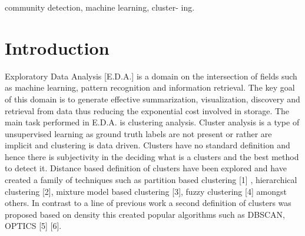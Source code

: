 \documentclass[conference]{IEEEtran}
\begin{document}




\maketitle

\begin{abstract}

\end{abstract}

\begin{IEEEkeywords}community detection, machine learning, cluster-
ing.
    
\end{IEEEkeywords}


%
\IEEEpeerreviewmaketitle



\section{Introduction}
Exploratory Data Analysis [E.D.A.] is a domain on the
intersection of fields such as machine learning, pattern
recognition and information retrieval. The key goal of this
domain is to generate effective summarization, visualization,
discovery and retrieval from data thus reducing the exponential
cost involved in storage. The main task performed in E.D.A. is
clustering analysis. Cluster analysis is a type of unsupervised
learning as ground truth labels are not present or rather
are implicit and clustering is data driven. Clusters have no
standard definition and hence there is subjectivity in the
deciding what is a clusters and the best method to detect
it. Distance based definition of clusters have been explored
and have created a family of techniques such as partition
based clustering [1] , hierarchical clustering [2], mixture
model based clustering [3], fuzzy clustering [4] amongst
others. In contrast to a line of previous work a second
definition of clusters was proposed based on density this
created popular algorithms such as DBSCAN, OPTICS [5] [6].\\
\end{document}
